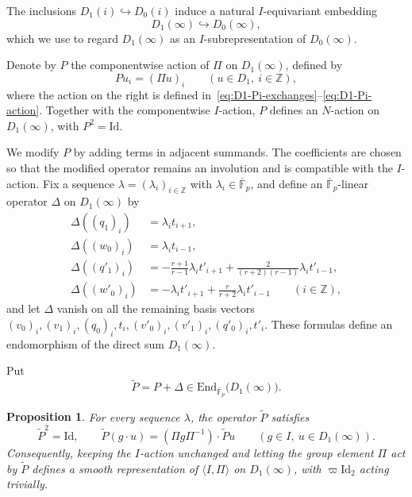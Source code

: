 \documentclass[10pt]{article}
\theoremstyle{plain}
\newtheorem{proposition}[theorem]{Proposition}
\theoremstyle{definition}
\theoremstyle{remark}
\newcommand{\Fpbar}{\overline{\mathbb{F}}_p}
\newcommand{\End}{\mathrm{End}}
\newcommand{\Id}{\mathrm{Id}}
\begin{document}
The inclusions $D_1(i)\hookrightarrow D_0(i)$ induce a natural $I$-equivariant embedding
\[
D_1(\infty)\hookrightarrow D_0(\infty),
\]
which we use to regard $D_1(\infty)$ as an $I$-subrepresentation of $D_0(\infty)$.

Denote by $P$ the componentwise action of $\Pi$ on $D_1(\infty)$, defined by
\begin{equation}\label{eq:D1-infinity-Pi-action}
P u_i=(\Pi u)_i
\qquad(u\in D_1,\ i\in\mathbb{Z}),
\end{equation}
where the action on the right is defined in~\eqref{eq:D1-Pi-exchanges}--\eqref{eq:D1-Pi-action}. Together with the componentwise $I$-action, $P$ defines an $N$-action on $D_1(\infty)$, with $P^2=\Id$.

We modify $P$ by adding terms in adjacent summands. The coefficients are chosen so that the modified operator remains an involution and is compatible with the $I$-action. Fix a sequence $\lambda=(\lambda_i)_{i\in\mathbb{Z}}$ with $\lambda_i\in\Fpbar$, and define an $\Fpbar$-linear operator $\Delta$ on $D_1(\infty)$ by
\begin{equation}\label{eq:D1-infinity-Delta-action}
\begin{aligned}
\Delta((q_1)_i)&=\lambda_i t_{i+1},\\[4pt]
\Delta((w_0)_i)&=\lambda_i t_{i-1},\\[6pt]
\Delta((q'_1)_i)&=-\frac{r+1}{r-1}\lambda_i t'_{i+1}
+\frac{2}{(r+2)(r-1)}\lambda_i t'_{i-1},\\[6pt]
\Delta((w'_0)_i)&=-\lambda_i t'_{i+1}
+\frac{r}{r+2}\lambda_i t'_{i-1}
\qquad(i\in\mathbb{Z}),
\end{aligned}
\end{equation}
and let $\Delta$ vanish on all the remaining basis vectors $(v_0)_i,(v_1)_i,(q_0)_i,t_i,(v'_0)_i,(v'_1)_i,(q'_0)_i,t'_i$. These formulas define an endomorphism of the direct sum $D_1(\infty)$.

Put
\begin{equation}\label{eq:D1-infinity-modified-Pi}
\widetilde P=P+\Delta\in\End_{\Fpbar}\bigl(D_1(\infty)\bigr).
\end{equation}

\begin{proposition}\label{prop:D1-infinity-modified-action}
For every sequence $\lambda$, the operator $\widetilde P$ satisfies
\[
\widetilde P^2=\Id,\qquad
\widetilde P(g\cdot u)=(\Pi g\Pi^{-1})\cdot\widetilde P u
\qquad(g\in I,\ u\in D_1(\infty)).
\]
Consequently, keeping the $I$-action unchanged and letting the group element $\Pi$ act by $\widetilde P$ defines a smooth representation of $\langle I,\Pi\rangle$ on $D_1(\infty)$, with $\varpi\Id_2$ acting trivially.
\end{proposition}
\end{document}
